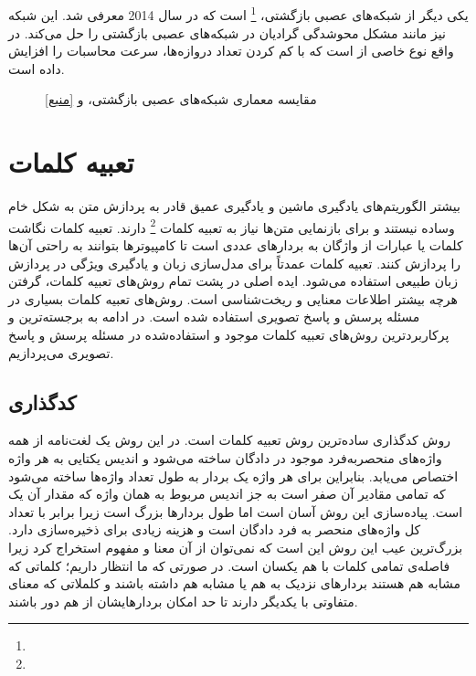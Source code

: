\subsection{}
	یکی دیگر از شبکه‌های عصبی بازگشتی، 
	\footnote{}\cite{cho2014learning}
	است که در سال 2014 معرفی شد. این شبکه نیز مانند 
	مشکل محوشدگی گرادیان در شبکه‌های عصبی بازگشتی را حل می‌کند. در واقع 
	نوع خاصی از 
	است که با کم کردن تعداد دروازه‌ها، سرعت محاسبات را افزایش داده است.
	 \begin{figure}
	 	\caption[مقایسه معماری شبکه‌‌های عصبی بازگشتی،  و ]{مقایسه معماری شبکه‌‌های عصبی بازگشتی،  و  \href{http://dprogrammer.org/rnn-lstm-gru}{[منبع]}}
	 	\label{fig:RNN-LSTM-GRU}
	 \end{figure}

\section{تعبیه کلمات}
	بیشتر الگوریتم‌های یادگیری ماشین و یادگیری عمیق  قادر به پردازش متن به شکل خام وساده نیستند  و برای بازنمایی متن‌ها نیاز به تعبیه کلمات 
	\footnote{}
	دارند. تعبیه کلمات نگاشت کلمات یا عبارات از واژگان به بردارهای عددی است تا کامپیوترها بتوانند به راحتی آن‌ها را پردازش کنند. تعبیه کلمات عمدتاً برای مدل‌سازی زبان و یادگیری ویژگی در پردازش زبان طبیعی استفاده می‌شود. ایده اصلی در پشت تمام روش‌های تعبیه کلمات، گرفتن هرچه بیشتر اطلاعات معنایی و ریخت‌شناسی است. روش‌های تعبیه کلمات بسیاری در مسئله پرسش و پاسخ تصویری استفاده شده است. در ادامه به برجسته‌ترین و پرکاربردترین روش‌های تعبیه کلمات موجود و استفاده‌شده در مسئله پرسش و پاسخ تصویری می‌پردازیم.
\subsection{کدگذاری }
	روش کدگذاری
	ساده‌ترین روش تعبیه کلمات است. در این روش یک لغت‌‌نامه از همه واژه‌های منحصربه‌فرد موجود در دادگان ساخته ‌می‌شود و اندیس یکتایی به هر واژه اختصاص می‌یابد. بنابراین برای هر واژه یک بردار به طول تعداد واژ‌ه‌ها ساخته می‌شود که تمامی مقادیر آن صفر است به جز اندیس مربوط به همان واژه که مقدار آن یک است. پیاده‌سازی این روش آسان است اما طول بردارها  بزرگ است زیرا برابر با تعداد کل واژه‌های منحصر به فرد دادگان است و هزینه زیادی برای ذخیره‌سازی دارد. بزرگ‌ترین عیب این روش  این است که نمی‌توان از آن معنا  و مفهوم استخراج کرد زیرا فاصله‌ی تمامی کلمات با هم یکسان است. در صورتی که ما انتظار داریم؛ کلماتی که مشابه هم هستند بردارهای نزدیک به هم یا مشابه هم داشته باشند و کلملاتی که معنای متفاوتی با یکدیگر دارند تا حد امکان بردارهایشان از هم دور باشند. 

